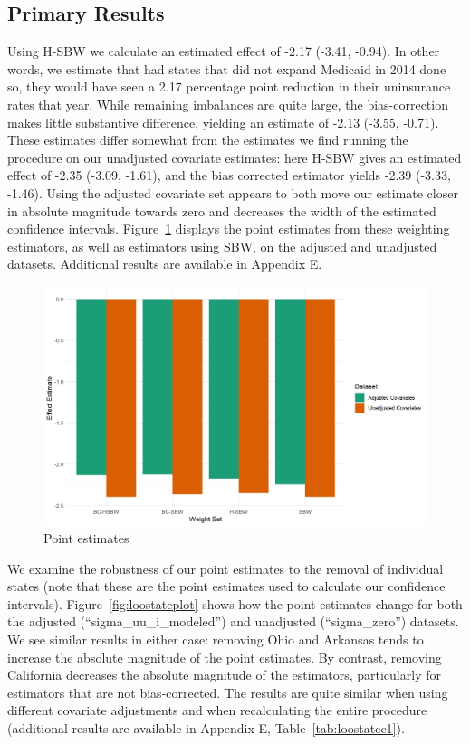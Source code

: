 \documentclass[aoas]{imsart}
\theoremstyle{plain}
\theoremstyle{remark}
\begin{document}
\subsection{Primary Results}

Using H-SBW we calculate an estimated effect of -2.17 (-3.41, -0.94). In other words, we estimate that had states that did not expand Medicaid in 2014 done so, they would have seen a 2.17 percentage point reduction in their uninsurance rates that year. While remaining imbalances are quite large, the bias-correction makes little substantive difference, yielding an estimate of -2.13 (-3.55, -0.71). These estimates differ somewhat from the estimates we find running the procedure on our unadjusted covariate estimates: here H-SBW gives an estimated effect of -2.35 (-3.09, -1.61), and the bias corrected estimator yields -2.39 (-3.33, -1.46). Using the adjusted covariate set appears to both move our estimate closer in absolute magnitude towards zero and decreases the width of the estimated confidence intervals. Figure~\ref{fig:estimators} displays the point estimates from these weighting estimators, as well as estimators using SBW, on the adjusted and unadjusted datasets. Additional results are available in Appendix E.

\begin{figure}
\begin{center}
    \caption{Point estimates}
    \label{fig:estimators}
    \includegraphics[scale=0.6]{01_Plots/point-estimates-c1.png}
\end{center}
\end{figure}

We examine the robustness of our point estimates to the removal of individual states (note that these are the point estimates used to calculate our confidence intervals). Figure~\ref{fig:loostateplot} shows how the point estimates change for both the adjusted (``sigma\_uu\_i\_modeled'') and unadjusted (``sigma\_zero'') datasets. We see similar results in either case: removing Ohio and Arkansas tends to increase the absolute magnitude of the point estimates. By contrast, removing California decreases the absolute magnitude of the estimators, particularly for estimators that are not bias-corrected. The results are quite similar when using different covariate adjustments and when recalculating the entire procedure (additional results are available in Appendix E, Table~\ref{tab:loostatec1}). 
\end{document}
